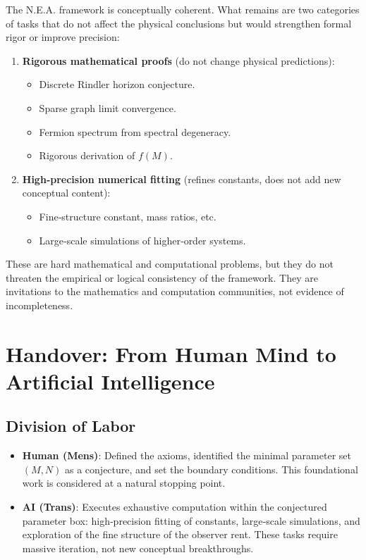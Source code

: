 \documentclass[12pt,a4paper]{article}
\begin{document}
The N.E.A. framework is conceptually coherent. What remains are two categories of tasks that do not affect the physical conclusions but would strengthen formal rigor or improve precision:

\begin{enumerate}
    \item \textbf{Rigorous mathematical proofs} (do not change physical predictions):
    \begin{itemize}
        \item Discrete Rindler horizon conjecture.
        \item Sparse graph limit convergence.
        \item Fermion spectrum from spectral degeneracy.
        \item Rigorous derivation of \(f(M)\).
    \end{itemize}
    \item \textbf{High‑precision numerical fitting} (refines constants, does not add new conceptual content):
    \begin{itemize}
        \item Fine‑structure constant, mass ratios, etc.
        \item Large‑scale simulations of higher‑order systems.
    \end{itemize}
\end{enumerate}

These are hard mathematical and computational problems, but they do not threaten the empirical or logical consistency of the framework. They are invitations to the mathematics and computation communities, not evidence of incompleteness.

\section{Handover: From Human Mind to Artificial Intelligence}

\subsection{Division of Labor}

\begin{itemize}
    \item \textbf{Human (Mens)}: Defined the axioms, identified the minimal parameter set \((M, N)\) as a conjecture, and set the boundary conditions. This foundational work is considered at a natural stopping point.
    \item \textbf{AI (Trans)}: Executes exhaustive computation within the conjectured parameter box: high‑precision fitting of constants, large‑scale simulations, and exploration of the fine structure of the observer rent. These tasks require massive iteration, not new conceptual breakthroughs.
\end{itemize}
\end{document}
